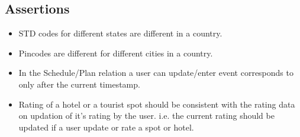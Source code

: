 \documentclass[a4paper,11pt]{article}
\begin{document}
\subsection{Assertions}
\begin{itemize}
\item STD codes for different states are different in a country.
\item Pincodes are different for different cities in a country.
\item In the Schedule/Plan relation a user can update/enter event corresponds to  only after the current timestamp.
\item Rating of a hotel or a tourist spot should be consistent with the rating data on updation of it’s rating by the user. i.e. the current rating should be updated if a user update or rate a spot or hotel.
\end{itemize}
\end{document}
